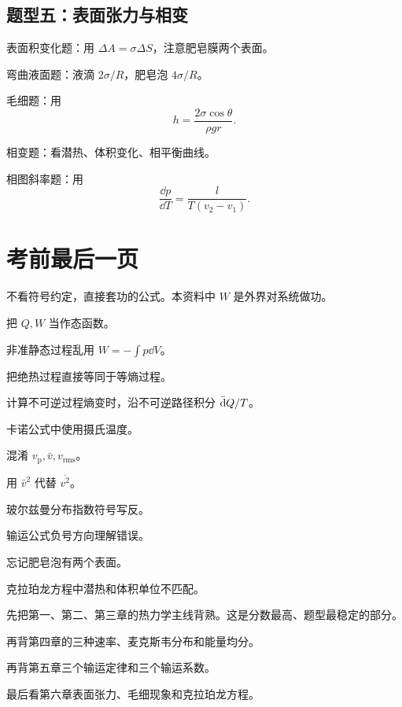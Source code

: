 \subsection{题型五：表面张力与相变}

\begin{MethodBox}[核心路线]
\begin{ReviewList}
  \item 表面积变化题：用 \(\Delta A=\sigma\Delta S\)，注意肥皂膜两个表面。
  \item 弯曲液面题：液滴 \(2\sigma/R\)，肥皂泡 \(4\sigma/R\)。
  \item 毛细题：用
  \[
    h=\frac{2\sigma\cos\theta}{\rho gr}.
  \]
  \item 相变题：看潜热、体积变化、相平衡曲线。
  \item 相图斜率题：用
  \[
    \frac{\dd p}{\dd T}=\frac{l}{T(v_2-v_1)}.
  \]
\end{ReviewList}
\end{MethodBox}

\section{考前最后一页}

\begin{WarnBox}[全书最高频错误]
\begin{PitfallList}
  \item 不看符号约定，直接套功的公式。本资料中 \(W\) 是外界对系统做功。
  \item 把 \(Q,W\) 当作态函数。
  \item 非准静态过程乱用 \(W=-\int p\dd V\)。
  \item 把绝热过程直接等同于等熵过程。
  \item 计算不可逆过程熵变时，沿不可逆路径积分 \(\mathop{}\!\bar{\mathrm{d}} Q/T\)。
  \item 卡诺公式中使用摄氏温度。
  \item 混淆 \(v_{\mathrm p},\bar v,v_{\mathrm{rms}}\)。
  \item 用 \(\bar v^2\) 代替 \(\overline{v^2}\)。
  \item 玻尔兹曼分布指数符号写反。
  \item 输运公式负号方向理解错误。
  \item 忘记肥皂泡有两个表面。
  \item 克拉珀龙方程中潜热和体积单位不匹配。
\end{PitfallList}
\end{WarnBox}

\begin{KeyBox}[考前检查顺序]
\begin{ReviewList}
  \item 先把第一、第二、第三章的热力学主线背熟。这是分数最高、题型最稳定的部分。
  \item 再背第四章的三种速率、麦克斯韦分布和能量均分。
  \item 再背第五章三个输运定律和三个输运系数。
  \item 最后看第六章表面张力、毛细现象和克拉珀龙方程。
\end{ReviewList}
\end{KeyBox}

